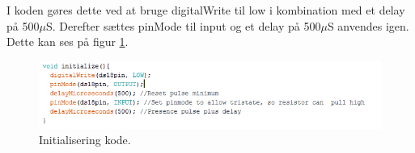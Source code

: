 I koden gøres dette ved at bruge digitalWrite til low i kombination med et delay på 500$\mu$S. Derefter sættes pinMode til input og et delay på 500$\mu$S anvendes igen. Dette kan ses på figur \ref{sensor_kode}.

\begin{figure}[h!]
  \centering
  \includegraphics[width=1\textwidth]{figures/Init.png}
  \caption{Initialisering kode.}
  \label{sensor_kode}
\end{figure}